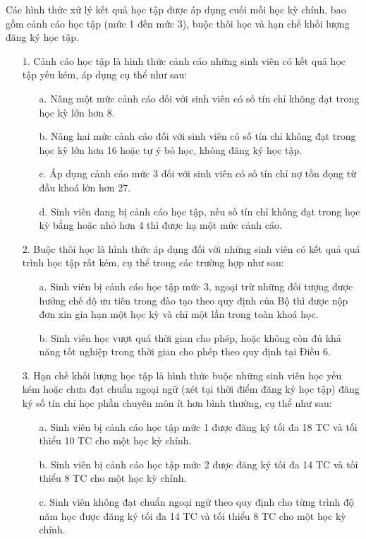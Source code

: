 Các hình thức xử lý kết quả học tập được áp dụng cuối mỗi học kỳ chính, bao gồm cảnh cáo học tập (mức 1 đến mức 3), buộc thôi học và hạn chế khối lượng đăng ký học tập.
\begin{itemize}
  \item[1.] Cảnh cáo học tập là hình thức cảnh cáo những sinh viên có kết quả học tập yếu kém, áp dụng cụ thể như sau:
    \begin{itemize}
      \item[a.] Nâng một mức cảnh cáo đối với sinh viên có số tín chỉ không đạt trong học kỳ lớn hơn 8.
      \item[b.] Nâng hai mức cảnh cáo đối với sinh viên có số tín chỉ không đạt trong học kỳ lớn hơn 16 hoặc tự ý bỏ học, không đăng ký học tập. 
      \item[c.] Áp dụng cảnh cáo mức 3 đối với sinh viên có số tín chỉ nợ tồn đọng từ đầu khoá lớn hơn 27.
      \item[d.] Sinh viên đang bị cảnh cáo học tập, nếu số tín chỉ không đạt trong học kỳ bằng hoặc nhỏ hơn 4 thì được hạ một mức cảnh cáo.  
    \end{itemize}
  \item[2.] Buộc thôi học là hình thức áp dụng đối với những sinh viên có kết quả quá trình học tập rất kém, cụ thể trong các trường hợp như sau:
    \begin{itemize}
      \item[a.] Sinh viên bị cảnh cáo học tập mức 3, ngoại trừ những đối tượng được hưởng chế độ ưu tiên trong đào tạo theo quy định của Bộ thì được nộp đơn xin gia hạn một học kỳ và chỉ một lần trong toàn khoá học.
      \item[b.] Sinh viên học vượt quá thời gian cho phép, hoặc không còn đủ khả năng tốt nghiệp trong thời gian cho phép theo quy định tại Điều 6.
    \end{itemize}
  \item[3.] Hạn chế khối lượng học tập là hình thức buộc những sinh viên học yếu kém hoặc chưa đạt chuẩn ngoại ngữ (xét tại thời điểm đăng ký học tập) đăng ký số tín chỉ học phần chuyên môn ít hơn bình thường, cụ thể như sau:
    \begin{itemize}
      \item[a.] Sinh viên bị cảnh cáo học tập mức 1 được đăng ký tối đa 18 TC và tối thiểu 10 TC cho một học kỳ chính.
      \item[b.] Sinh viên bị cảnh cáo học tập mức 2 được đăng ký tối đa 14 TC và tối thiểu 8 TC cho một học kỳ chính.
      \item[c.] Sinh viên không đạt chuẩn ngoại ngữ theo quy định cho từng trình độ năm học được đăng ký tối đa 14 TC và tối thiểu 8 TC cho một học kỳ chính.  
    \end{itemize}
\end{itemize}

